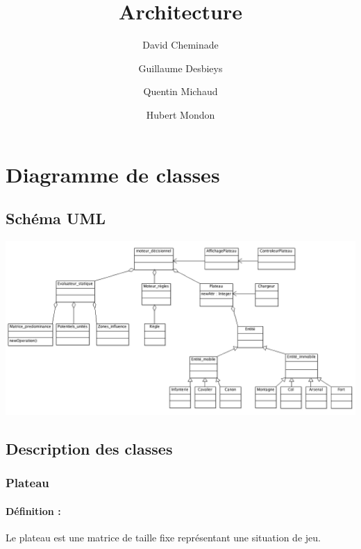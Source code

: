 \documentclass[12pt]{article}
\begin{document}
 
	\title{Architecture}             
	\author{
		David Cheminade
		\and
		Guillaume Desbieys
		\and
		Quentin Michaud
		\and
		Hubert Mondon
	}                       
	\date{}
	\maketitle{}                

	\let\thefootnote\relax

	\section{Diagramme de classes}    

		\subsection{Schéma UML}

			\includegraphics[scale=0.4]{images/diag_classes.png}

			\clearpage

		\subsection{Description des classes}

			\subsubsection{Plateau}
			
				\paragraph{Définition :}

				Le plateau est une matrice de taille fixe représentant une situation de jeu.
\end{document}
